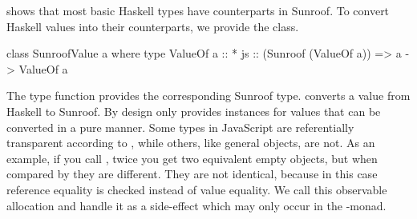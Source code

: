  shows that most basic 
Haskell types have counterparts in
Sunroof. To convert Haskell values into their 
counterparts, we provide the  class.
\begin{Code}
class SunroofValue a where
  type ValueOf a :: *
  js :: (Sunroof (ValueOf a)) => a -> ValueOf a
\end{Code}
The type function
 \cite{Chakravarty:05:AssociatedTypeSynonyms} 
provides the corresponding Sunroof type.
 converts a value from Haskell to Sunroof. 
By design  
only provides instances for values that can be converted in a pure
manner. Some types in JavaScript are referentially 
transparent according to \Src{==}, while others, like general objects,
are not. As an example, if you call , twice you get two 
equivalent empty objects, but when compared by \Src{==} they are different. They
are not identical, because in this case reference equality is checked
instead of value equality. We call this observable allocation and handle 
it as a side-effect which may only occur in the \JS-monad. 


\begin{comment}
Sunroof also offers the ability to work with record like data structures.
For this purpose Sunroof offers the \Src{JSTuple} type class.
\begin{Code}
class Sunroof o => JSTuple o where
  type Internals o
  match :: (Sunroof o) => o -> Internals o
  tuple :: Internals o -> JS t o
\end{Code}
If you have a record of Sunroof data that you want to
encode as a JavaScript object you can provide this ability 
by implementing \Src{JSTuple}. The \Src{Internals} type function
delivers your record type. Encoding that record as a \Src{Sunroof}
value is done through \Src{tuple}. 
Because of the observable allocation issue, we have to be 
inside the \JS-monad to do this.
Decomposing the encoding is done with \Src{match}. Because the
\Src{JSTuple} idiom is meant to represent immutable data structures, this 
can be done in a pure manner although there are ways to mutate 
values referenced by the decomposed record, since they are only 
references to the actual data in JavaScript.
\end{comment}

